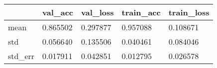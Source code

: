 \begin{tabular}{|l|l|l|l|l|}
\toprule \hline
 & val\_acc & val\_loss & train\_acc & train\_loss \\ \hline
\midrule
mean & 0.865502 & 0.297877 & 0.957088 & 0.108671 \\ \hline
std & 0.056640 & 0.135506 & 0.040461 & 0.084046 \\ \hline
std\_err & 0.017911 & 0.042851 & 0.012795 & 0.026578 \\ \hline
\bottomrule
\end{tabular}
